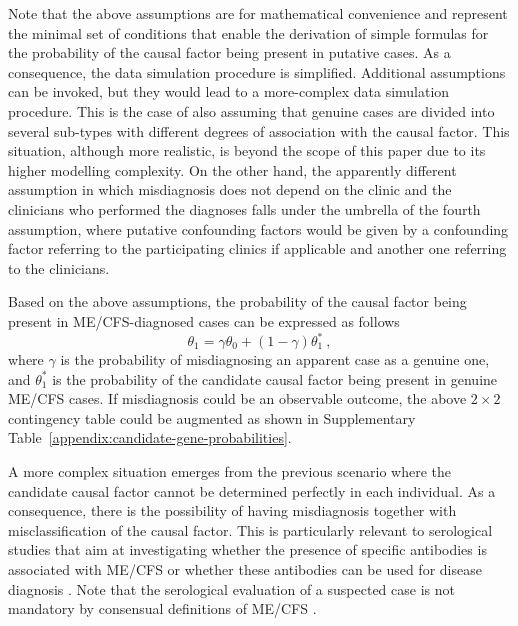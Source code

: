 Note that the above assumptions are for mathematical convenience and represent the minimal set of conditions that enable the derivation of simple formulas for the probability of the causal factor being present in putative cases. As a consequence, the data simulation procedure is simplified. Additional assumptions can be invoked, but they would lead to a more-complex data simulation procedure. This is the case of also assuming that genuine cases are divided into several sub-types with different degrees of association with the causal factor. This situation, although more realistic, is beyond the scope of this paper due to its higher modelling complexity. On the other hand, the apparently different assumption in which misdiagnosis does not depend on the clinic and the clinicians who performed the diagnoses falls under the umbrella of the fourth assumption, where putative confounding factors would be given by a confounding factor referring to the participating clinics if applicable and another one referring to the clinicians.

Based on the above assumptions, the probability of the causal factor being present in ME/CFS-diagnosed cases can be expressed as follows
% 
\begin{equation}
    \theta_1 = \gamma \theta_0 + (1 - \gamma) \theta_1^*\ ,
    \label{eq:genep}
\end{equation}
% 
where $\gamma$ is the probability of misdiagnosing an apparent case as a genuine one, and $\theta_1^*$ is the probability of the candidate causal factor being present in genuine ME/CFS cases. If misdiagnosis could be an observable outcome, the above $2\times2$ contingency table could be augmented as shown in Supplementary Table~\ref{appendix:candidate-gene-probabilities}.

A more complex situation emerges from the previous scenario where the candidate causal factor cannot be determined perfectly in each individual. As a consequence, there is the possibility of having misdiagnosis together with misclassification of the causal factor. This is particularly relevant to serological studies that aim at investigating whether the presence of specific antibodies is associated with ME/CFS \citep{ruiz-pablos2021EpsteinBarrVirus} or whether these antibodies can be used for disease diagnosis \citep{sepulveda2022RevisitingIgG}. Note that the serological evaluation of a suspected case is not mandatory by consensual definitions of ME/CFS \citep{fukuda1994ChronicFatigue}.

